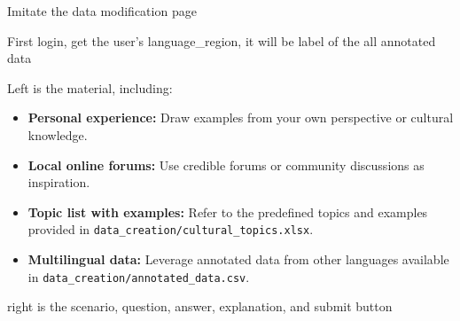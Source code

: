 Imitate the data modification page

First login, get the user's language_region, it will be label of the all annotated data

Left is the material, including:

\begin{itemize}
    \item \textbf{Personal experience:} Draw examples from your own perspective or cultural knowledge.
    \item \textbf{Local online forums:} Use credible forums or community discussions as inspiration.
    \item \textbf{Topic list with examples:} Refer to the predefined topics and examples provided in \texttt{data\_creation/cultural\_topics.xlsx}.
    \item \textbf{Multilingual data:} Leverage annotated data from other languages available in \texttt{data\_creation/annotated\_data.csv}.
\end{itemize}

right is the scenario, question, answer, explanation, and submit button